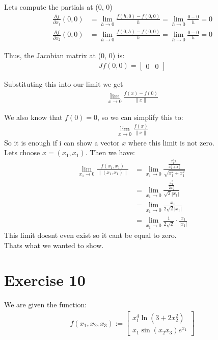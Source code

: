 \documentclass{article}
\begin{document}
Lets compute the partials at (0, 0) \\
\begin{align*}
   \frac{\partial f}{\partial x_1}(0, 0) &= \lim_{h \to 0} \frac{f(h, 0) - f(0, 0)}{h} = \lim_{h \to 0} \frac{0 - 0}{h} = 0 \\
   \frac{\partial f}{\partial x_2}(0, 0) &= \lim_{h \to 0} \frac{f(0, h) - f(0, 0)}{h} = \lim_{h \to 0} \frac{0 - 0}{h} = 0
\end{align*}

Thus, the Jacobian matrix at (0, 0) is:
\begin{align*}
   Jf(0, 0) = \begin{bmatrix}
      0 & 0
   \end{bmatrix}
\end{align*}

Substituting this into our limit we get
\begin{align*}
   \lim_{x \to 0} \frac{f(x) - f(0)}{\|x\|}
\end{align*}

We also know that \( f(0) = 0 \), so we can simplify this to:
\begin{align*}
   \lim_{x \to 0} \frac{f(x)}{\|x\|}
\end{align*}
So it is enough if i can show a vector \(x\) where this limit is not zero. \\
Lets choose \( x = (x_1, x_1) \). Then we have:
\begin{align*}
   \lim_{x_1 \to 0} \frac{f(x_1, x_1)}{\|(x_1, x_1)\|} &= \lim_{x_1 \to 0} \frac{\frac{x_1^2 x_1}{x_1^2 + x_1^2}}{\sqrt{x_1^2 + x_1^2}} \\
   &= \lim_{x_1 \to 0} \frac{\frac{x_1^3}{2x_1^2}}{\sqrt{2} |x_1|} \\
   &= \lim_{x_1 \to 0} \frac{x_1}{2\sqrt{2} |x_1|} \\
   &= \lim_{x_1 \to 0} \frac{1}{2\sqrt{2}} \cdot \frac{x_1}{|x_1|}
\end{align*}
This limit doesnt even exist so it cant be equal to zero. \\
Thats what we wanted to show.

\section*{Exercise 10}
We are given the function:
\begin{align*}
   f(x_1, x_2, x_3) :=
   \begin{bmatrix}
      x_1^4 \ln(3 + 2x_2^2) \\
      x_1 \sin(x_2 x_3) e^{x_1}
   \end{bmatrix}
\end{align*}
\end{document}
